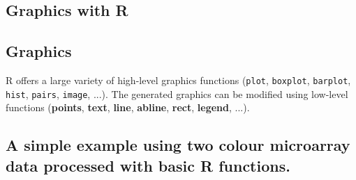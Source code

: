 \documentclass[10pt]{article}\usepackage[]{graphicx}\usepackage[]{color}
\newcommand{\Rfunction}[1]{{\texttt{#1}}}
\begin{document}
\subsection{Graphics with R}

\subsection{Graphics}

R offers a large variety of high-level graphics functions (\Rfunction{plot}, \Rfunction{boxplot}, \Rfunction{barplot}, \Rfunction{hist}, \Rfunction{pairs}, \Rfunction{image}, ...). The generated graphics can be modified using low-level functions (\textbf{points}, \textbf{text}, \textbf{line}, \textbf{abline}, \textbf{rect}, \textbf{legend}, ...).

\subsection{A simple example using two colour microarray data processed with basic R functions.}
\end{document}
